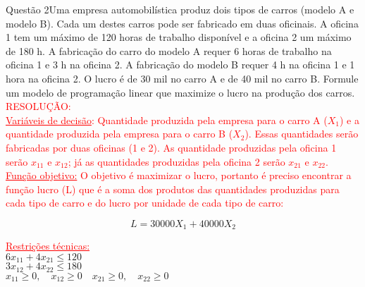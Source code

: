 \documentclass[12pt]{article}
\begin{document}
\begin{section}{Questão 2}{Uma empresa automobilística produz dois tipos de carros (modelo A e modelo B). Cada um destes carros pode ser fabricado em duas oficinais. A oficina 1 tem um máximo de 120 horas de trabalho disponível e a oficina 2 um máximo de 180 h. A fabricação do carro do modelo A requer 6 horas de trabalho na oficina 1 e 3 h na oficina 2. A fabricação do modelo B requer 4 h na oficina 1 e 1 hora na oficina 2. O lucro é de 30 mil no carro A e de 40 mil no carro B. Formule um modelo de programação linear que maximize o lucro na produção dos carros.}\\

\noindent \textcolor{red}{RESOLUÇÃO:}\\

\noindent \textcolor{red}{\underline{Variáveis de decisão}: Quantidade produzida pela empresa para o carro A ($X_1$) e a quantidade produzida pela empresa para o carro B ($X_2$). Essas quantidades serão fabricadas por duas oficinas (1 e 2). As quantidade produzidas pela oficina 1 serão $x_{11}$ e $x_{12}$; já as quantidades produzidas pela oficina 2 serão $x_{21}$ e $x_{22}$.}\\

\noindent \textcolor{red}{\underline{Função objetivo:} O objetivo é maximizar o lucro, portanto é preciso encontrar a função lucro (L) que é a soma dos produtos das quantidades produzidas para cada tipo de carro e do lucro por unidade de cada tipo de carro:}

$$
    L = 30000X_{1} + 40000X_{2}
$$

\noindent \textcolor{red}{\underline{Restrições técnicas:}}\\

\noindent $6x_{11} + 4x_{21} \leq 120$\\
$3x_{12} + 4x_{22} \leq 180$\\
$x_{11} \geq 0, \quad x_{12} \geq 0 \quad x_{21} \geq 0, \quad x_{22} \geq 0$

\end{section}
\newpage
\end{document}
